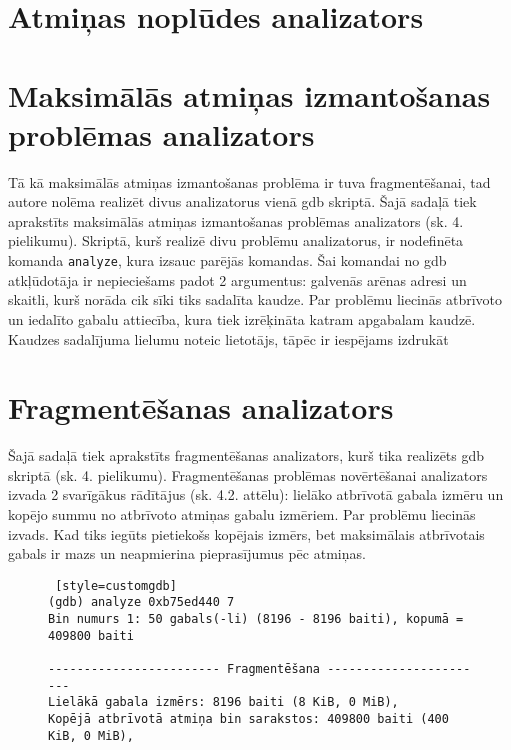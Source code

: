 \section{Atmiņas noplūdes analizators}

\section{Maksimālās atmiņas izmantošanas problēmas analizators}
Tā kā maksimālās atmiņas izmantošanas problēma ir tuva fragmentēšanai, tad autore nolēma realizēt divus analizatorus vienā gdb skriptā.
Šajā sadaļā tiek aprakstīts maksimālās atmiņas izmantošanas problēmas analizators (sk. 4. pielikumu).
Skriptā, kurš realizē divu problēmu analizatorus, ir nodefinēta komanda \texttt{analyze}, kura izsauc parējās komandas.
Šai komandai no gdb atkļūdotāja ir nepieciešams padot 2 argumentus: galvenās arēnas adresi un skaitli, kurš norāda cik sīki tiks sadalīta kaudze.
Par problēmu liecinās atbrīvoto un iedalīto gabalu attiecība, kura tiek izrēķināta katram apgabalam kaudzē.
Kaudzes sadalījuma lielumu noteic lietotājs, tāpēc ir iespējams izdrukāt 



\section{Fragmentēšanas analizators}
Šajā sadaļā tiek aprakstīts fragmentēšanas analizators, kurš tika realizēts gdb skriptā (sk. 4. pielikumu).
Fragmentēšanas problēmas novērtēšanai analizators izvada 2 svarīgākus rādītājus (sk. 4.2. attēlu): lielāko atbrīvotā gabala izmēru un kopējo summu no atbrīvoto atmiņas gabalu izmēriem.
Par problēmu liecinās izvads. Kad tiks iegūts pietiekošs kopējais izmērs, bet maksimālais atbrīvotais gabals ir mazs un neapmierina pieprasījumus pēc atmiņas.

\begin{figure}[h]
\begin{lstlisting} [style=customgdb]
(gdb) analyze 0xb75ed440 7
Bin numurs 1: 50 gabals(-li) (8196 - 8196 baiti), kopumā = 409800 baiti

------------------------ Fragmentēšana -----------------------
Lielākā gabala izmērs: 8196 baiti (8 KiB, 0 MiB),
Kopējā atbrīvotā atmiņa bin sarakstos: 409800 baiti (400 KiB, 0 MiB),
\end{lstlisting}
\caption{\textbf{\fontsize{11}{12}\selectfont {Fragmentēšanas rādītāji}}}
\end{figure}


